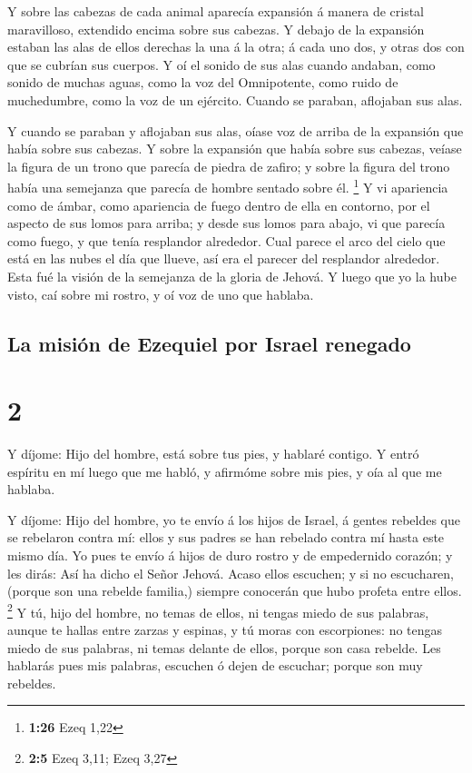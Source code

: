  Y sobre las cabezas de cada animal aparecía expansión á
manera de cristal maravilloso, extendido encima sobre sus cabezas.
 Y debajo de la expansión estaban las alas de ellos
derechas la una á la otra; á cada uno dos, y otras dos con que se
cubrían sus cuerpos.  Y oí el sonido de sus alas cuando
andaban, como sonido de muchas aguas, como la voz del Omnipotente, como
ruido de muchedumbre, como la voz de un ejército. Cuando se paraban,
aflojaban sus alas.

 Y cuando se paraban y aflojaban sus alas, oíase voz de
arriba de la expansión que había sobre sus cabezas.  Y
sobre la expansión que había sobre sus cabezas, veíase la figura de un
trono que parecía de piedra de zafiro; y sobre la figura del trono había
una semejanza que parecía de hombre sentado sobre él. \footnote{\textbf{1:26}
  Ezeq 1,22}  Y vi apariencia como de ámbar, como
apariencia de fuego dentro de ella en contorno, por el aspecto de sus
lomos para arriba; y desde sus lomos para abajo, vi que parecía como
fuego, y que tenía resplandor alrededor.  Cual parece el
arco del cielo que está en las nubes el día que llueve, así era el
parecer del resplandor alrededor. Esta fué la visión de la semejanza de
la gloria de Jehová. Y luego que yo la hube visto, caí sobre mi rostro,
y oí voz de uno que hablaba.

\hypertarget{la-misiuxf3n-de-ezequiel-por-israel-renegado}{%
\subsection{La misión de Ezequiel por Israel
renegado}\label{la-misiuxf3n-de-ezequiel-por-israel-renegado}}

\hypertarget{section-1}{%
\section{2}\label{section-1}}

 Y díjome: Hijo del hombre, está sobre tus pies, y hablaré
contigo.  Y entró espíritu en mí luego que me habló, y
afirmóme sobre mis pies, y oía al que me hablaba.

 Y díjome: Hijo del hombre, yo te envío á los hijos de
Israel, á gentes rebeldes que se rebelaron contra mí: ellos y sus padres
se han rebelado contra mí hasta este mismo día.  Yo pues te
envío á hijos de duro rostro y de empedernido corazón; y les dirás: Así
ha dicho el Señor Jehová.  Acaso ellos escuchen; y si no
escucharen, (porque son una rebelde familia,) siempre conocerán que hubo
profeta entre ellos. \footnote{\textbf{2:5} Ezeq 3,11; Ezeq 3,27}
 Y tú, hijo del hombre, no temas de ellos, ni tengas miedo
de sus palabras, aunque te hallas entre zarzas y espinas, y tú moras con
escorpiones: no tengas miedo de sus palabras, ni temas delante de ellos,
porque son casa rebelde.  Les hablarás pues mis palabras,
escuchen ó dejen de escuchar; porque son muy rebeldes.

